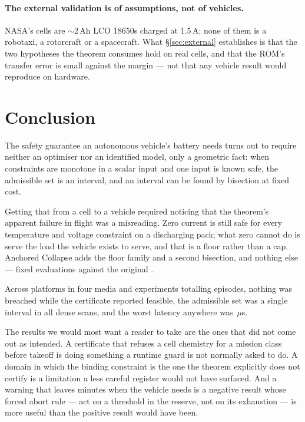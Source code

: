 \documentclass[11pt,letterpaper]{article}
\theoremstyle{definition}
\theoremstyle{remark}
\begin{document}
\paragraph{The external validation is of assumptions, not of vehicles.} NASA's cells are $\sim$2\,Ah
LCO 18650s charged at 1.5\,A; none of them is a robotaxi, a rotorcraft or a spacecraft. What
\S\ref{sec:external} establishes is that the two hypotheses the theorem consumes hold on real
cells, and that the ROM's transfer error is small against the margin --- not that any vehicle
result would reproduce on hardware.

\section{Conclusion}

The safety guarantee an autonomous vehicle's battery needs turns out to require neither an
optimiser nor an identified model, only a geometric fact: when constraints are monotone in a
scalar input and one input is known safe, the admissible set is an interval, and an interval can
be found by bisection at fixed cost.

Getting that from a cell to a vehicle required noticing that the theorem's apparent failure in
flight was a misreading. Zero current is still safe for every temperature and voltage constraint
on a discharging pack; what zero cannot do is serve the load the vehicle exists to serve, and
that is a floor rather than a cap. Anchored Collapse adds the floor family and a second
bisection, and nothing else --- \evalDischarge{} fixed evaluations against the original
\evalCharge{}.

Across \vPlatforms{} platforms in four media and \vExperiments{} experiments totalling
\vTotalEpisodes{} episodes, nothing was breached while the certificate reported feasible, the
admissible set was a single interval in all \scanTotal{} dense scans, and the worst latency
anywhere was \worstLatency\,$\mu$s.

The results we would most want a reader to take are the ones that did not come out as intended.
A certificate that refuses a cell chemistry for a mission class before takeoff is doing
something a runtime guard is not normally asked to do. A domain in which the binding constraint
is the one the theorem explicitly does not certify is a limitation a less careful register would
not have surfaced. And a warning that leaves \uIceClosureMed{} minutes when the vehicle
needs \uIceTransit{} is a negative result whose forced abort rule --- act on a threshold in the
reserve, not on its exhaustion --- is more useful than the positive result would have been.
\end{document}
